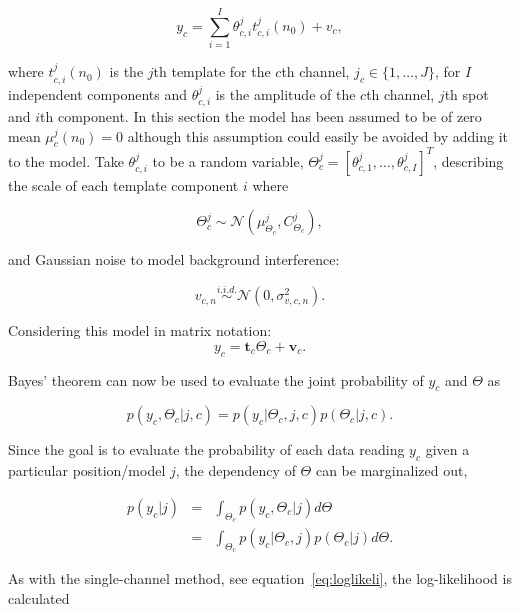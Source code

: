 \begin{equation}\label{eq:mod1_c}
y_c = \sum_{i=1}^{I} \theta_{c,i}^j t_{c,i}^j(n_0) + v_c,
\end{equation}

where $t_{c,i}^j(n_0)$ is the $j$th template for the $c$th channel, $j_c \in \{1, \ldots ,J\}$, for $I$ independent components and $\theta_{c,i}^j$ is the amplitude of the $c$th channel, $j$th spot and $i$th component. In this section the model has been assumed to be of zero mean $\mu_c^j(n_0) =0$ although this assumption could easily be avoided by adding it to the model. Take $\theta_{c,i}^j$ to be a random variable, $\Theta_c^j = [\theta_{c,1}^j,\ldots,\theta_{c,I}^j]^T$, describing the scale of each template component $i$ where

\begin{equation}\label{eq:theta_c}
\Theta_c^j \sim \mathcal{N}(\mu_{\Theta_c}^j,C_{\Theta_c}^j),
\end{equation}

and Gaussian noise to model background interference:

\begin{equation}\label{eq:noise_c}
v_{c,n} \stackrel{i.i.d.}{\sim} \mathcal{N}(0,\sigma_{v,c,n}^2).
\end{equation}

Considering this model in matrix notation:
\begin{equation}\label{eq:mod2}
y_c = \textbf{t}_c\Theta_c + \textbf{v}_c.
\end{equation}

Bayes' theorem can now be used to evaluate the joint probability of $y_c$ and $\Theta$ as

\begin{equation}\label{eq:bayes1_c}
p(y_c,\Theta_c | j, c) = p(y_c|\Theta_c,j,c)p(\Theta_c | j,c).
\end{equation}

Since the goal is to evaluate the probability of each data reading $y_c$ given a particular position/model $j$, the dependency of $\Theta$ can be marginalized out,

\begin{eqnarray}\nonumber
p(y_c|j) &=& \int_{\Theta_c} p(y_c,\Theta_c|j) d\Theta \\
\label{eq:marg1_c} &=& \int_{\Theta_c} p(y_c|\Theta_c,j)p(\Theta_c|j) d\Theta.
\end{eqnarray}

As with the single-channel method, see equation~\ref{eq:loglikeli}, the log-likelihood is calculated

